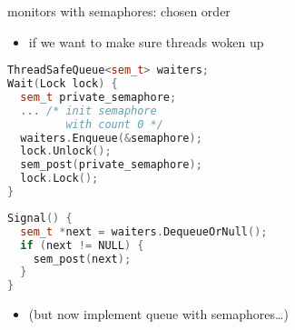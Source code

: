 
\begin{frame}[fragile,label=monitorWithSemaphoreCVA4]{monitors with semaphores: chosen order}
\begin{itemize}
    \item if we want to make sure threads woken up 
\end{itemize}
\begin{minipage}{0.45\textwidth}
\begin{lstlisting}[language=C++,basicstyle=\fontsize{9.5}{10.5}\tt\selectfont]
ThreadSafeQueue<sem_t> waiters;
Wait(Lock lock) {
  sem_t private_semaphore;
  ... /* init semaphore
         with count 0 */
  waiters.Enqueue(&semaphore);
  lock.Unlock();
  sem_post(private_semaphore);
  lock.Lock();
}
\end{lstlisting}
\end{minipage}
\begin{minipage}{0.45\textwidth}
\begin{lstlisting}[language=C++,basicstyle=\fontsize{9.5}{10.5}\tt\selectfont]
Signal() {
  sem_t *next = waiters.DequeueOrNull();
  if (next != NULL) {
    sem_post(next);
  }
}
\end{lstlisting}
\end{minipage}
\begin{itemize}
\item<2-> (but now implement queue with semaphores\ldots)
\end{itemize}
\end{frame}
